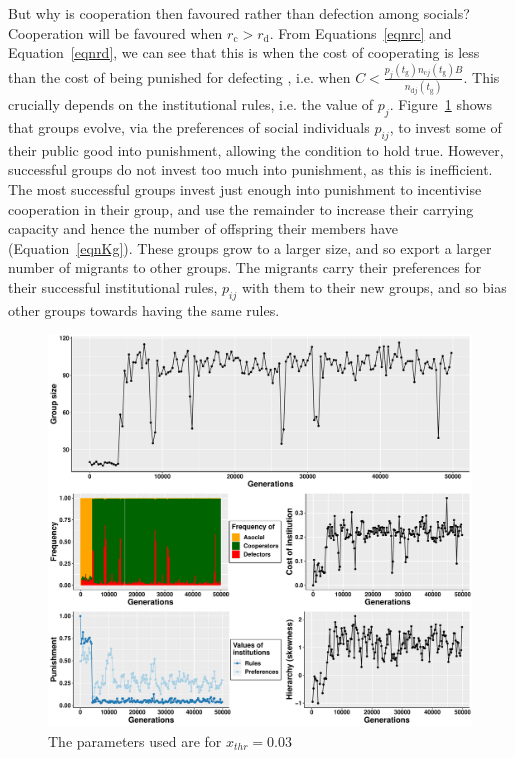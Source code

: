 \documentclass{rstb}
\begin{document}
\begin{linenumbers}
But why is cooperation then favoured rather than defection among socials? Cooperation will be favoured when $r_\mathrm{c}>r_\mathrm{d}$. From Equations~\ref{eqnrc} and Equation~\ref{eqnrd}, we can see that this is when the cost of cooperating is less than the cost of being punished for defecting \cite{Boyd:1992:a}, i.e. when $C < \frac{p_j(t_\mathrm{g})n_{\mathrm{c}j}(t_\mathrm{g})B}{n_{\mathrm{d}j}\left(t_\mathrm{g}\right)}$. This crucially depends on the institutional rules, i.e. the value of $p_j$. Figure~\ref{figBaseline} shows that groups evolve, via the preferences of social individuals $p_{ij}$, to invest some of their public good into punishment, allowing the condition to hold true. However, successful groups do not invest too much into punishment, as this is inefficient. The most successful groups invest just enough into punishment to incentivise cooperation in their group, and use the remainder to increase their carrying capacity and hence the number of offspring their members have (Equation~\ref{eqnKg}). These groups grow to a larger size, and so export a larger number of migrants to other groups. The migrants carry their preferences for their successful institutional rules, $p_{ij}$ with them to their new groups, and so bias other groups towards having the same rules.  

\begin{figure}
    \centering
    \includegraphics[width=0.8\linewidth]{Figures/pt_summary.pdf}
    \caption{The parameters used are for $x_{thr} = 0.03$}
    \label{figBaseline}
\end{figure}


\end{linenumbers}
\end{document}
